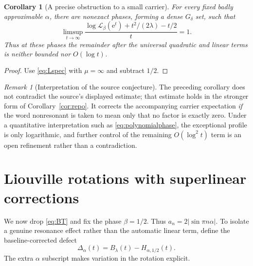 \documentclass[11pt,a4paper]{article}
\newtheorem{corollary}[theorem]{Corollary}
\theoremstyle{definition}
\theoremstyle{remark}\newtheorem{remark}[theorem]{Remark}
\newcommand{\LL}{\mathcal L}
\newcommand{\e}{\mathrm e}
\begin{document}
\begin{corollary}[A precise obstruction to a small carrier]
\label{cor:carrier}
For every fixed badly approximable $\alpha$, there are nonexact phases,
forming a dense $G_\delta$ set, such that
\[
 \limsup_{t\to\infty}
 \frac{\log\LL_\beta(\e^t)+t^2/(2\lambda)-t/2}{t}=1.
\]
Thus at these phases the remainder after the universal quadratic and linear
terms is neither bounded nor $O(\log t)$.
\end{corollary}
\begin{proof}
Use \eqref{eq:Lspec} with $\mu=\infty$ and subtract $1/2$.
\end{proof}

\begin{remark}[Interpretation of the source conjecture]
The preceding corollary does not contradict the source's displayed estimate;
that estimate holds in the stronger form of Corollary~\ref{cor:repo}.
It corrects the accompanying carrier expectation \emph{if} the word
nonresonant is taken to mean only that no factor is exactly zero.
Under a quantitative interpretation such as \eqref{eq:polynomialphase},
the exceptional profile is only logarithmic, and further control of the
remaining $O(\log^2 t)$ term is an open refinement rather than a contradiction.
\end{remark}

\section{Liouville rotations with superlinear corrections}
\label{sec:liouville}

We now drop \eqref{eq:BT} and fix the phase $\beta=1/2$.
Thus $a_n=2|\sin\pi n\alpha|$.  To isolate a genuine resonance effect rather
than the automatic linear term, define the baseline-corrected defect
\begin{equation}
 \Delta_\alpha(t)=B_\lambda(t)-H_{\alpha,1/2}(t).
 \label{eq:Delta}
\end{equation}
The extra $\alpha$ subscript makes variation in the rotation explicit.
\end{document}
